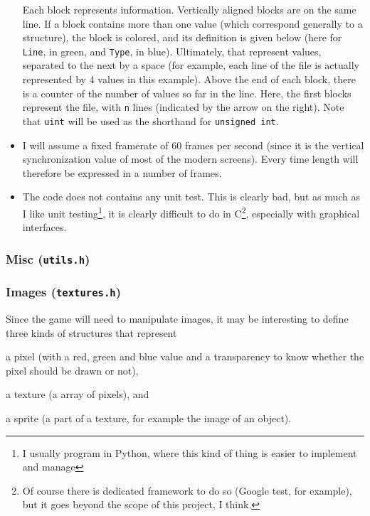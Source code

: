 \documentclass[12pt,a4paper]{article}
\begin{document}
\begin{itemize}
\begin{center}
\end{center}
Each block represents information. Vertically aligned blocks are on the same line. If a block contains more than one value (which correspond generally to a structure), the block is colored, and its definition is given below (here for \texttt{Line}, in green, and \texttt{Type}, in blue). Ultimately, that represent values, separated to the next by a space (for example, each line of the file is actually represented by 4 values in this example). Above the end of each block, there is a counter of the number of values so far in the line.
Here, the first blocks represent the file, with \texttt{n} lines (indicated by the arrow on the right). Note that \texttt{uint} will be used as the shorthand for \texttt{unsigned int}.
\item I will assume  a fixed framerate of 60 frames per second (since it is the vertical synchronization value of most of the modern screens). Every time length will therefore be expressed in a number of frames. 
\item The code does not contains any unit test. This is clearly bad, but as much as I like unit testing\footnote{I usually program in Python, where this kind of thing is easier to implement and manage}, it is clearly difficult to do in C\footnote{Of course there is dedicated framework to do so (Google test, for example), but it goes beyond the scope of this project, I think.}, especially with graphical interfaces.
\end{itemize}

\subsubsection{Misc (\texttt{utils.h})}

\subsubsection{Images (\texttt{textures.h})}

Since the game will need to manipulate images, it may be interesting to define three kinds of structures that represent \begin{inparaenum}[i)]
\item a pixel (with a red, green and blue value and a transparency to know whether the pixel should be drawn or not), 
\item a texture (a array of pixels), and
\item a sprite (a part of a texture, for example the image of an object).
\end{inparaenum}
\end{document}
